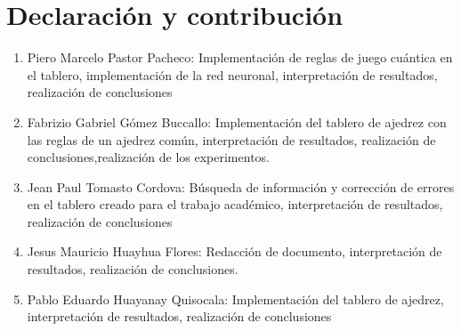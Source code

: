 \section{Declaración y contribución}
\begin{enumerate}
\item Piero Marcelo Pastor Pacheco: Implementación de reglas de juego cuántica en el tablero, implementación de la red neuronal, interpretación de resultados, realización de conclusiones
\item Fabrizio Gabriel Gómez  Buccallo: Implementación del tablero de ajedrez con las reglas de un ajedrez común, interpretación de resultados, realización de conclusiones,realización de los experimentos.
\item Jean Paul Tomasto Cordova: Búsqueda de información y corrección de errores en el tablero creado para el trabajo académico, interpretación de resultados, realización de conclusiones
\item Jesus Mauricio Huayhua Flores: Redacción de documento, interpretación de resultados, realización de conclusiones.
\item Pablo Eduardo Huayanay Quisocala: Implementación del tablero de ajedrez, interpretación de resultados, realización de conclusiones
\end{enumerate}